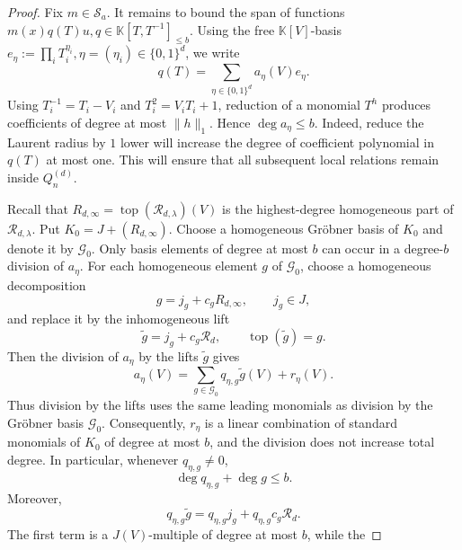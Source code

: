 \documentclass[11pt,reqno]{amsart}
\newcommand\K{\ensuremath{\mathbb{K}}}
\theoremstyle{definition}
\theoremstyle{plain}
\numberwithin{equation}{section}
\begin{document}
\begin{proof}
Fix $m\in \mathcal{S}_a$. It remains to bound the span of functions $m(x)q(T)u,q\in \K[T,T^{-1}]_{\le b}$. Using the free $\K[V]$-basis $e_\eta:=\prod_{i}T_i^{\eta_i}, \eta=(\eta_i)\in \lbrace 0,1\rbrace^{d}$, we write
\begin{equation*}
    q(T)=\sum_{\eta\in \{0,1\}^d}a_\eta (V)e_\eta.
\end{equation*}
Using $T_i^{-1}=T_i-V_i$ and $T_i^2=V_iT_i+1$, reduction of a monomial $T^h$ produces coefficients of degree at most $\|h\|_1$. Hence $\deg a_\eta \le b$. Indeed, reduce the Laurent radius by $1$ lower will increase the degree of coefficient polynomial in $q(T)$ at most one.  This will ensure that all subsequent local relations remain inside $Q_n^{(d)}$.

Recall that $R_{d,\infty}=\operatorname{top}(\mathcal{R}_{d,\lambda})(V)$ is the highest-degree homogeneous part of $\mathcal{R}_{d,\lambda}$. Put $K_0=J+(R_{d,\infty})$. Choose a homogeneous Gröbner basis of
$K_0$ and denote it by $\mathcal{G}_0$.  Only basis elements of degree at most $b$ can occur in a
degree-$b$ division of $a_\eta$.  For each homogeneous element $g$ of $\mathcal{G}_0$, choose a
homogeneous decomposition
\begin{equation*}
        g=j_g+c_gR_{d,\infty},\qquad j_g\in J,
\end{equation*}
and replace it by the inhomogeneous lift
\begin{equation*}
        \widetilde g=j_g+c_g\mathcal R_d,
        \qquad \operatorname{top}(\widetilde g)=g.
\end{equation*}
Then the division of $a_\eta$ by the lifts $\widetilde g$ gives
\begin{equation*}
    a_\eta(V)=\sum_{g\in \mathcal{G}_0}q_{\eta,g}\widetilde{g}(V) +r_\eta(V).
\end{equation*}
Thus division by the lifts uses the same leading monomials as division
by the Gröbner basis $\mathcal G_0$. Consequently, $r_\eta$ is a linear
combination of standard monomials of $K_0$ of degree at most $b$, and
the division does not increase total degree. In particular, whenever
$q_{\eta,g}\neq0$,
\begin{equation*}
    \deg q_{\eta,g}+\deg g\le b.
\end{equation*}
Moreover,
\begin{equation*}
    q_{\eta,g}\widetilde g
    =
    q_{\eta,g}j_g
    +
    q_{\eta,g}c_g\mathcal R_d.
\end{equation*}
The first term is a $J(V)$-multiple of degree at most $b$, while the

\end{proof}
\end{document}
